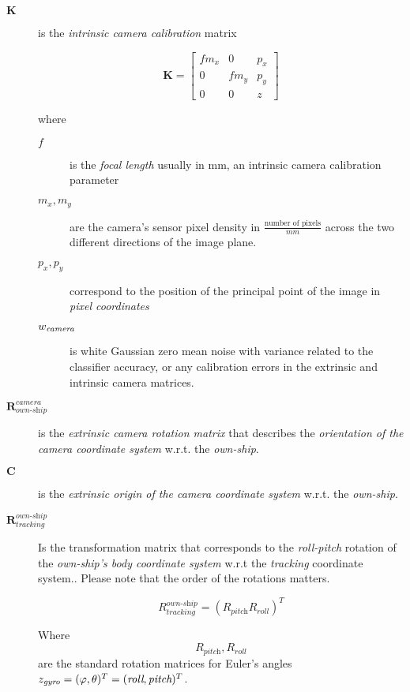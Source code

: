 \begin{description}
\item[$\mathbf{K}$]
is the \emph{intrinsic camera calibration} matrix

$$\mathbf{K} = \begin{bmatrix}f m_x &0 &p_x \\
0 &f m_y &p_y \\
0 &0 &z
\end{bmatrix} $$

where

\begin{description}
	\item[$f$] is the \emph{focal length} usually in mm, an intrinsic camera calibration parameter
	\item[$m_x, m_y$] are the camera's sensor pixel density in $\frac{\text{number of pixels}}{mm}$ across the two different directions of the image plane.
	\item[$p_x,p_y$] correspond to the position of the principal point of the image in \emph{pixel coordinates}
	\item[${w}_{\textit{camera}}$] is white Gaussian zero mean noise with variance related to the classifier accuracy, or any calibration errors in the extrinsic and intrinsic camera matrices.
	
\end{description}

\item[$\mathbf{R}_{\textit{own-ship}}^{\textit{camera}}$]
is the \emph{extrinsic camera rotation matrix }that describes the \emph{orientation of the camera coordinate system} w.r.t. the \emph{own-ship}.

\item[$\mathbf{C}$]
is the  \emph{extrinsic origin of the camera coordinate system} w.r.t. the \emph{own-ship}.


\item[$\mathbf{R}_{\textit{tracking}}^{\textit{own-ship}}$]
Is the transformation matrix that corresponds to the \emph{roll-pitch} rotation of the \emph{own-ship's body coordinate system} w.r.t the \emph{tracking} coordinate system.. Please note that the order of the rotations matters.

\begin{equation}
R_{\textit{tracking}}^{\textit{own-ship}}=\left( R_{\textit{pitch}} R_{\textit{roll}}\right)^T
\end{equation}

Where $$R_{\textit{pitch}},R_{\textit{roll}}$$ are the standard rotation matrices for Euler's angles $z_{\textit{gyro}}=({\varphi},{\theta})^T = (\textit{roll},\textit{pitch})^T$.



\end{description}
